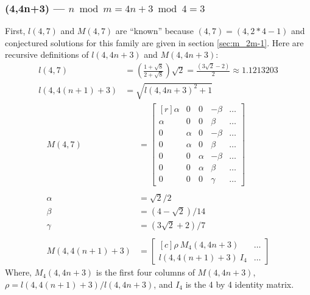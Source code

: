 \documentclass[12pt,titlepage]{article}
\begin{document}
\subsubsection{(4,4n+3) --- $n \bmod m = 4n+3 \bmod 4 = 3$}
First, $l(4,7)$ and $M(4,7)$ are ``known'' because $(4,7) = (4,2*4-1)$ and
conjectured solutions for this family are given in section \ref{sec:m_2m-1}.
Here are recursive definitions of $l(4,4n+3)$ and $M(4,4n+3)$:
\begin{align*}
l(4,7)        &= \left(\frac{1+\sqrt{8}}{2+\sqrt{8}}\right) \sqrt{2}
               = \frac{(3\sqrt{2}-2)}{2}
               \approx 1.1213203        \\
l(4,4(n+1)+3) &= \sqrt{l(4,4n+3)^2 + 1}
\end{align*}
\begin{align*}
M(4,7) &=
\begin{bmatrix*}[r]
\alpha & 0      & 0      & -\beta  & \ldots \\
\alpha & 0      & 0      &  \beta  & \ldots \\
0      & \alpha & 0      & -\beta  & \ldots \\
0      & \alpha & 0      &  \beta  & \ldots \\
0      & 0      & \alpha & -\beta  & \ldots \\
0      & 0      & \alpha &  \beta  & \ldots \\
0      & 0      & 0      &  \gamma & \ldots
\end{bmatrix*} \\
& \\
\alpha &= \sqrt{2}/2         \\
\beta  &= (4  - \sqrt{2})/14 \\
\gamma &= (3\sqrt{2} + 2)/7  \\
& \\
M(4,4(n+1)+3) &=
\begin{bmatrix*}[c]
\rho~M_4(4,4n+3)  & \ldots \\
l(4,4(n+1)+3)~I_4 & \ldots
\end{bmatrix*}
\end{align*}
Where, $M_4(4,4n+3)$ is the first four columns of $M(4,4n+3)$,
$\rho = l(4,4(n+1)+3)/l(4,4n+3)$, and $I_4$ is the 4 by 4 identity matrix.
\end{document}
